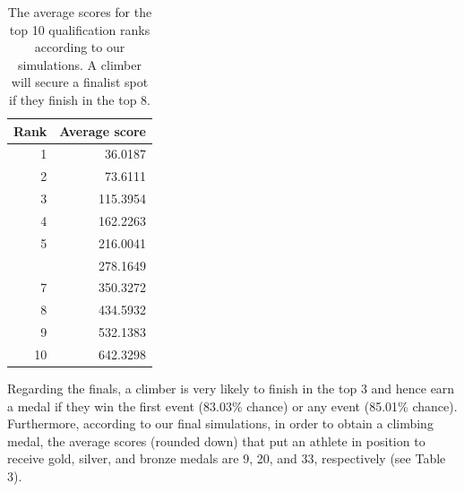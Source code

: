 \documentclass[12pt]{article}
\begin{document}
\begin{table}[H]

\caption{\label{tab:unnamed-chunk-8}The average scores for the top 10 qualification ranks according to our simulations. A climber will secure a finalist spot if they finish in the top 8.}
\centering
\begin{tabular}[t]{rr}
\toprule
Rank & Average score\\
\midrule
1 & 36.0187\\
2 & 73.6111\\
3 & 115.3954\\
4 & 162.2263\\
5 & 216.0041\\
\addlinespace
6 & 278.1649\\
7 & 350.3272\\
8 & 434.5932\\
9 & 532.1383\\
10 & 642.3298\\
\bottomrule
\end{tabular}
\end{table}

Regarding the finals, a climber is very likely to finish in the top 3
and hence earn a medal if they win the first event (83.03\% chance) or
any event (85.01\% chance). Furthermore, according to our final
simulations, in order to obtain a climbing medal, the average scores
(rounded down) that put an athlete in position to receive gold, silver,
and bronze medals are 9, 20, and 33, respectively (see Table 3).

\begin{table}[H]

\caption{\label{tab:unnamed-chunk-9}title}
\centering
{}
\end{table}
\end{document}
